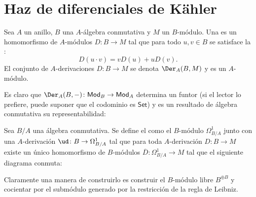 \section{Haz de diferenciales de Kähler}
\begin{mydef}
	Sea $A$ un anillo, $B$ una $A$-álgebra conmutativa y $M$ un $B$-módulo.
	Una  es un homomorfismo de $A$-módulos $D \colon B \to M$ tal que para todo $u, v\in B$
	se satisface la :
	$$ D(u\cdot v) = vD(u) + uD(v). $$
	El conjunto de $A$-derivaciones $D \colon B \to M$ se denota $\Der_A(B, M)$ y es un $A$-módulo.
\end{mydef}

Es claro que $\Der_A(B, -) \colon \mathsf{Mod}_B \to \mathsf{Mod}_A$ determina un funtor (si el lector lo prefiere, puede suponer que el codominio es
$\mathsf{Set}$) y es un resultado de álgebra conmutativa su representabilidad:
\begin{mydef}
	Sea $B/A$ una álgebra conmutativa.
	Se define el  como el $B$-módulo
	$\Omega_{B/A}^1$ junto con una $A$-derivación $\ud \colon B \to \Omega_{B/A}^1$ tal que para toda $A$-derivación $D \colon B \to M$
	existe un único homomorfismo de $B$-módulos $\overline{D} \colon \Omega_{B/A}^1 \to M$ tal que el siguiente diagrama conmuta:
	\begin{center}
	\end{center}
\end{mydef}

Claramente una manera de construirlo es construir el $B$-módulo libre $B^{\oplus B}$ y cocientar por el submódulo
generado por la restricción de la regla de Leibniz.

